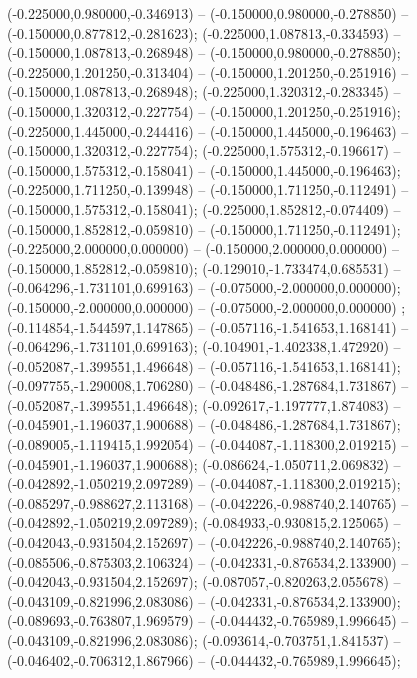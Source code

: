  (-0.225000,0.980000,-0.346913) -- (-0.150000,0.980000,-0.278850) -- (-0.150000,0.877812,-0.281623);
 (-0.225000,1.087813,-0.334593) -- (-0.150000,1.087813,-0.268948) -- (-0.150000,0.980000,-0.278850);
 (-0.225000,1.201250,-0.313404) -- (-0.150000,1.201250,-0.251916) -- (-0.150000,1.087813,-0.268948);
 (-0.225000,1.320312,-0.283345) -- (-0.150000,1.320312,-0.227754) -- (-0.150000,1.201250,-0.251916);
 (-0.225000,1.445000,-0.244416) -- (-0.150000,1.445000,-0.196463) -- (-0.150000,1.320312,-0.227754);
 (-0.225000,1.575312,-0.196617) -- (-0.150000,1.575312,-0.158041) -- (-0.150000,1.445000,-0.196463);
 (-0.225000,1.711250,-0.139948) -- (-0.150000,1.711250,-0.112491) -- (-0.150000,1.575312,-0.158041);
 (-0.225000,1.852812,-0.074409) -- (-0.150000,1.852812,-0.059810) -- (-0.150000,1.711250,-0.112491);
 (-0.225000,2.000000,0.000000) -- (-0.150000,2.000000,0.000000) -- (-0.150000,1.852812,-0.059810);
 (-0.129010,-1.733474,0.685531) -- (-0.064296,-1.731101,0.699163) -- (-0.075000,-2.000000,0.000000);
 (-0.150000,-2.000000,0.000000) -- (-0.075000,-2.000000,0.000000) ;
 (-0.114854,-1.544597,1.147865) -- (-0.057116,-1.541653,1.168141) -- (-0.064296,-1.731101,0.699163);
 (-0.104901,-1.402338,1.472920) -- (-0.052087,-1.399551,1.496648) -- (-0.057116,-1.541653,1.168141);
 (-0.097755,-1.290008,1.706280) -- (-0.048486,-1.287684,1.731867) -- (-0.052087,-1.399551,1.496648);
 (-0.092617,-1.197777,1.874083) -- (-0.045901,-1.196037,1.900688) -- (-0.048486,-1.287684,1.731867);
 (-0.089005,-1.119415,1.992054) -- (-0.044087,-1.118300,2.019215) -- (-0.045901,-1.196037,1.900688);
 (-0.086624,-1.050711,2.069832) -- (-0.042892,-1.050219,2.097289) -- (-0.044087,-1.118300,2.019215);
 (-0.085297,-0.988627,2.113168) -- (-0.042226,-0.988740,2.140765) -- (-0.042892,-1.050219,2.097289);
 (-0.084933,-0.930815,2.125065) -- (-0.042043,-0.931504,2.152697) -- (-0.042226,-0.988740,2.140765);
 (-0.085506,-0.875303,2.106324) -- (-0.042331,-0.876534,2.133900) -- (-0.042043,-0.931504,2.152697);
 (-0.087057,-0.820263,2.055678) -- (-0.043109,-0.821996,2.083086) -- (-0.042331,-0.876534,2.133900);
 (-0.089693,-0.763807,1.969579) -- (-0.044432,-0.765989,1.996645) -- (-0.043109,-0.821996,2.083086);
 (-0.093614,-0.703751,1.841537) -- (-0.046402,-0.706312,1.867966) -- (-0.044432,-0.765989,1.996645);
